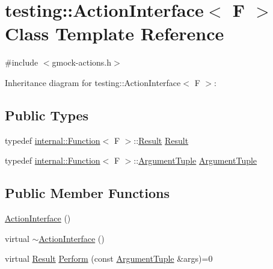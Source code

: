 \hypertarget{classtesting_1_1_action_interface}{}\section{testing\+:\+:Action\+Interface$<$ F $>$ Class Template Reference}
\label{classtesting_1_1_action_interface}


{\ttfamily \#include $<$gmock-\/actions.\+h$>$}



Inheritance diagram for testing\+:\+:Action\+Interface$<$ F $>$\+:
\subsection*{Public Types}
\begin{DoxyCompactItemize}
\item 
typedef \hyperlink{structtesting_1_1internal_1_1_function}{internal\+::\+Function}$<$ F $>$\+::\hyperlink{classtesting_1_1_action_interface_a7477de2fe3e4e01c59db698203acaee7}{Result} \hyperlink{classtesting_1_1_action_interface_a7477de2fe3e4e01c59db698203acaee7}{Result}
\item 
typedef \hyperlink{structtesting_1_1internal_1_1_function}{internal\+::\+Function}$<$ F $>$\+::\hyperlink{classtesting_1_1_action_interface_af72720d864da4d606629e83edc003511}{Argument\+Tuple} \hyperlink{classtesting_1_1_action_interface_af72720d864da4d606629e83edc003511}{Argument\+Tuple}
\end{DoxyCompactItemize}
\subsection*{Public Member Functions}
\begin{DoxyCompactItemize}
\item 
\hyperlink{classtesting_1_1_action_interface_a0f1d44e4c669a9cae5ee5b28419a6f52}{Action\+Interface} ()
\item 
virtual \hyperlink{classtesting_1_1_action_interface_a7dd0a5fc93d86ae3c9d04963b9f3a93f}{$\sim$\+Action\+Interface} ()
\item 
virtual \hyperlink{classtesting_1_1_action_interface_a7477de2fe3e4e01c59db698203acaee7}{Result} \hyperlink{classtesting_1_1_action_interface_a20f8624fcea1786f2992b358760422a0}{Perform} (const \hyperlink{classtesting_1_1_action_interface_af72720d864da4d606629e83edc003511}{Argument\+Tuple} \&args)=0
\end{DoxyCompactItemize}


